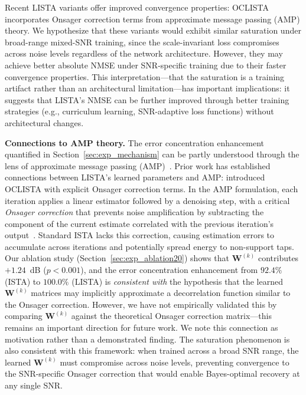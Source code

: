 \documentclass[a4paper,fleqn]{cas-sc}
\begin{document}
Recent LISTA variants offer improved convergence properties: OCLISTA~\citep{borgerding2020ista} incorporates Onsager correction terms from approximate message passing (AMP) theory. We hypothesize that these variants would exhibit similar saturation under broad-range mixed-SNR training, since the scale-invariant loss compromises across noise levels regardless of the network architecture. However, they may achieve better absolute NMSE under SNR-specific training due to their faster convergence properties. This interpretation---that the saturation is a training artifact rather than an architectural limitation---has important implications: it suggests that LISTA's NMSE can be further improved through better training strategies (e.g., curriculum learning, SNR-adaptive loss functions) without architectural changes.

\textbf{Connections to AMP theory.} The error concentration enhancement quantified in Section~\ref{sec:exp_mechanism} can be partly understood through the lens of approximate message passing (AMP)~\citep{donoho2009message, bayati2011dynamics}. Prior work has established connections between LISTA's learned parameters and AMP: \citet{borgerding2020ista} introduced OCLISTA with explicit Onsager correction terms. In the AMP formulation, each iteration applies a linear estimator followed by a denoising step, with a critical \emph{Onsager correction} that prevents noise amplification by subtracting the component of the current estimate correlated with the previous iteration's output~\citep{rangan2019approximate}. Standard ISTA lacks this correction, causing estimation errors to accumulate across iterations and potentially spread energy to non-support taps. Our ablation study (Section~\ref{sec:exp_ablation20}) shows that $\mathbf{W}^{(k)}$ contributes $+1.24$~dB ($p < 0.001$), and the error concentration enhancement from $92.4\%$ (ISTA) to $100.0\%$ (LISTA) is \emph{consistent with} the hypothesis that the learned $\mathbf{W}^{(k)}$ matrices may implicitly approximate a decorrelation function similar to the Onsager correction. However, we have not empirically validated this by comparing $\mathbf{W}^{(k)}$ against the theoretical Onsager correction matrix---this remains an important direction for future work. We note this connection as motivation rather than a demonstrated finding. The saturation phenomenon is also consistent with this framework: when trained across a broad SNR range, the learned $\mathbf{W}^{(k)}$ must compromise across noise levels, preventing convergence to the SNR-specific Onsager correction that would enable Bayes-optimal recovery at any single SNR.
\end{document}
